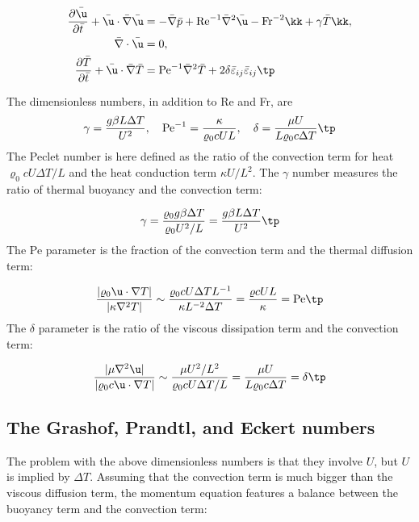 \documentclass[graybox,envcountchap,sectrefs,final]{svmonodo}
\begin{document}
\begin{align}
\frac{\partial \bar\u}{\partial \bar t} +
\bar \u\cdot\bar \nabla\bar\u
&= -\bar\nabla \bar p + \hbox{Re}^{-1}\bar \nabla^2\bar \u
- \hbox{Fr}^{-2}\kk  + \gamma \bar T\kk,
\label{scale:fluid:free_convection:eq:momentum_TB0}\\ 
\bar\nabla\cdot\bar\u & = 0,
\label{scale:fluid:free_convection:eq:cont_TB0}\\ 
\frac{\partial \bar T}{\partial \bar t} +
\bar\u\cdot\bar\nabla \bar T
&= \hbox{Pe}^{-1}\bar \nabla^2 \bar T + 2\delta
\bar\varepsilon_{ij}\bar\varepsilon_{ij}\tp
\label{scale:fluid:free_convection:eq:energy_TB0}
\end{align}

The dimensionless numbers, in addition to Re and Fr, are
\[
\gamma = \frac{g\beta L\Delta T }{U^2},\quad
\hbox{Pe}^{-1} = \frac{\kappa }{\varrho_0 c UL},\quad
\delta = \frac{\mu U}{L\varrho_0 c \Delta T}\tp
\]
The Peclet number is here defined as the ratio of the
convection term for heat $\varrho_0 c U\Delta T/L$ and the
heat conduction term $\kappa U/L^2$.
The $\gamma$ number measures the ratio of thermal buoyancy and
the convection term:

\[ \gamma = \frac{\varrho_0 g\beta \Delta T }{\varrho_0 U^2/L}
= \frac{g\beta L\Delta T }{U^2}\tp\]
The Pe parameter is the fraction of the convection term
and the thermal diffusion term:

\[ \frac{|\varrho_0\u\cdot\nabla T|}{|\kappa\nabla^2 T|}\sim
\frac{\varrho_0 c U \Delta T L^{-1}}{\kappa L^{-2}\Delta T}
= \frac{\varrho c UL}{\kappa } = \hbox{Pe}\tp\]
The $\delta$ parameter is the ratio of the viscous dissipation term
and the convection term:

\[ \frac{|\mu\nabla^2\u|}{|\varrho_0c\u\cdot\nabla T|}\sim
\frac{\mu U^2/L^2}{\varrho_0 c U \Delta T/L} =
\frac{\mu U}{L\varrho_0 c \Delta T} = \delta\tp
\]

\subsection{The Grashof, Prandtl, and Eckert numbers}


The problem with the above dimensionless numbers is that they involve
$U$, but $U$ is implied by $\Delta T$. Assuming that the convection
term is much bigger than the viscous diffusion term, the momentum
equation features a balance between the buoyancy term and the convection
term:
\end{document}
